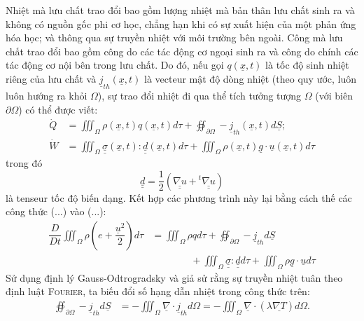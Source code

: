 \documentclass[../../../main.tex]{subfiles}
\begin{document}
    Nhiệt mà lưu chất trao đổi bao gồm lượng nhiệt mà bản thân lưu chất sinh ra và không có nguồn gốc phi cơ học, chẳng hạn khi có sự xuất hiện của một phản ứng hóa học; và thông qua sự truyền nhiệt với môi trường bên ngoài. Công mà lưu chất trao đổi bao gồm công do các tác động cơ ngoại sinh ra và công do chính các tác động cơ nội bên trong lưu chất. Do đó, nếu gọi $q\left(\underline{x},t\right)$ là tốc độ sinh nhiệt riêng của lưu chất và $\underline{j}_{th}\left(\underline{x},t\right)$ là vecteur mật độ dòng nhiệt (theo quy ước, luôn luôn hướng ra khỏi $\Omega$), sự trao đổi nhiệt đi qua thể tích tưởng tượng $\Omega$ (với biên $\partial\Omega$) có thể được viết:
    \begin{align}
        \dot{Q}&=\iiint_{\Omega}\rho\left(\underline{x},t\right)q\left(\underline{x},t\right)d\tau+\oiint_{\partial\Omega}-\underline{j}_{th}\left(\underline{x},t\right)d\underline{S};\\
        \dot{W}&=\iiint_{\Omega}\underline{\underline{\sigma}}\left(\underline{x},t\right)\colon\underline{\underline{d}}\left(\underline{x},t\right)d\tau+\iiint_{\Omega}\rho\left(\underline{x},t\right)\underline{g}\cdot\underline{u}\left(\underline{x},t\right)d\tau
    \end{align}
    trong đó
        \[
            \underline{\underline{d}}=\dfrac{1}{2}\left(\underline{\underline{\nabla u}} +{}^t\underline{\underline{\nabla u}}\right)
        \]
    là tenseur tốc độ biến dạng. Kết hợp các phương trình này lại bằng cách thế các công thức (...) vào (...):
        \[
            \begin{aligned}
                \dfrac{D}{Dt}\iiint_{\Omega}\rho\left(e+\dfrac{\underline{u}^2}{2}\right)d\tau&=\iiint_{\Omega}\rho qd\tau+\oiint_{\partial\Omega}-\underline{j}_{th}d\underline{S}\\
                &\qquad\qquad+\iiint_{\Omega}\underline{\underline{\sigma}}\colon\underline{\underline{d}}d\tau+\iiint_{\Omega}\rho\underline{g}\cdot\underline{u}d\tau
            \end{aligned}
        \]
    Sử dụng định lý Gauss-Odtrogradsky và giả sử rằng sự truyền nhiệt tuân theo định luật \textsc{Fourier}, ta biếu đổi số hạng dẫn nhiệt trong công thức trên:
        \[
            \begin{aligned}
                \oiint_{\partial\Omega}-\underline{j}_{th}d\underline{S}&=-\iiint_{\Omega}\underline{\nabla}\cdot\underline{j}_{th}d\Omega=-\iiint_{\Omega}\underline{\nabla}\cdot\left(\lambda\underline{\nabla T}\right)d\Omega.
            \end{aligned}
        \]
\end{document}

